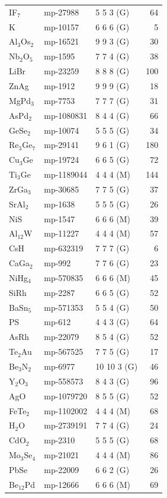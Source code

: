 \begin{longtable}{@{}l l l r@{}}
IF$_{7}$ & mp-27988 & 5 5 3 (G) & 64 \\
K & mp-10157 & 6 6 6 (G) & 5 \\
Al$_{3}$Os$_{2}$ & mp-16521 & 9 9 3 (G) & 30 \\
Nb$_{2}$O$_{5}$ & mp-1595 & 7 7 4 (G) & 38 \\
LiBr & mp-23259 & 8 8 8 (G) & 100 \\
ZnAg & mp-1912 & 9 9 9 (G) & 18 \\
MgPd$_{3}$ & mp-7753 & 7 7 7 (G) & 31 \\
AsPd$_{2}$ & mp-1080831 & 8 4 4 (G) & 66 \\
GeSe$_{2}$ & mp-10074 & 5 5 5 (G) & 34 \\
Re$_{3}$Ge$_{7}$ & mp-29141 & 9 6 1 (G) & 180 \\
Cu$_{3}$Ge & mp-19724 & 6 6 5 (G) & 72 \\
Ti$_{3}$Ge & mp-1189044 & 4 4 4 (M) & 144 \\
ZrGa$_{3}$ & mp-30685 & 7 7 5 (G) & 37 \\
SrAl$_{2}$ & mp-1638 & 5 5 5 (G) & 26 \\
NiS & mp-1547 & 6 6 6 (M) & 39 \\
Al$_{12}$W & mp-11227 & 4 4 4 (M) & 57 \\
CsH & mp-632319 & 7 7 7 (G) & 6 \\
CaGa$_{2}$ & mp-992 & 7 7 6 (G) & 23 \\
NiHg$_{4}$ & mp-570835 & 6 6 6 (M) & 45 \\
SiRh & mp-2287 & 6 6 5 (G) & 52 \\
BaSn$_{5}$ & mp-571353 & 5 5 4 (G) & 50 \\
PS & mp-612 & 4 4 3 (G) & 64 \\
AsRh & mp-22079 & 8 5 4 (G) & 52 \\
Te$_{2}$Au & mp-567525 & 7 7 5 (G) & 17 \\
Be$_{3}$N$_{2}$ & mp-6977 & 10 10 3 (G) & 46 \\
Y$_{2}$O$_{3}$ & mp-558573 & 8 4 3 (G) & 96 \\
AgO & mp-1079720 & 8 5 5 (G) & 52 \\
FeTe$_{2}$ & mp-1102002 & 4 4 4 (M) & 68 \\
H$_{2}$O & mp-2739191 & 7 7 4 (G) & 24 \\
CdO$_{2}$ & mp-2310 & 5 5 5 (G) & 68 \\
Mo$_{3}$Se$_{4}$ & mp-21021 & 4 4 4 (M) & 86 \\
PbSe & mp-22009 & 6 6 2 (G) & 26 \\
Be$_{12}$Pd & mp-12666 & 6 6 6 (M) & 69 \\

\end{longtable}
